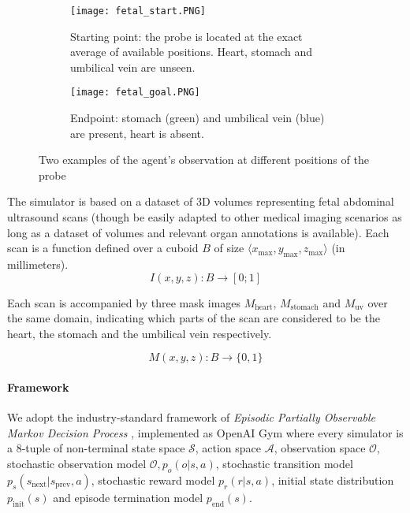 \begin{figure*}
    \centering
    \begin{subfigure}{.45\linewidth}
      \centering
      \texttt{[image: fetal\_start.PNG]}
      \caption{Starting point: the probe is located at the exact average of available positions. Heart, stomach and umbilical vein are unseen.}
      \label{fig:img-before}
    \end{subfigure}%
    \begin{subfigure}{.45\linewidth}
      \centering
      \texttt{[image: fetal\_goal.PNG]}
      \caption{Endpoint: stomach (green) and umbilical vein (blue) are present, heart is absent.}
      \label{fig:img-after}
    \end{subfigure}
    \caption{Two examples of the agent's observation at different positions of the probe}
    \label{fig:imgs}
\end{figure*}

The simulator is based on a dataset of 3D volumes representing fetal abdominal ultrasound scans (though be easily adapted to other medical imaging scenarios as long as a dataset of volumes and relevant organ annotations is available).
Each scan is a function defined over a cuboid $B$ of size $\langle x_\text{max},y_\text{max},z_\text{max} \rangle$ (in millimeters).
\begin{equation}
    I(x,y,z): B \rightarrow [0;1]
\end{equation}

Each scan is accompanied by three mask images $M_\text{heart}$, $M_\text{stomach}$ and $M_\text{uv}$ over the same domain, indicating which parts of the scan are considered to be the heart, the stomach and the umbilical vein respectively.

\begin{equation}
    M(x,y,z): B \rightarrow \{0,1\}
\end{equation}

\paragraph{Framework}

We adopt the industry-standard framework of {\em Episodic Partially Observable Markov Decision Process} \cite{kramerjdavidrPartiallyObservableMarkov1964, spaanPartiallyObservableMarkov2012}, implemented as OpenAI Gym \cite{gym} where every simulator is a 8-tuple of non-terminal state space $\mathcal{S}$, action space $\mathcal{A}$, observation space $\mathcal{O}$, stochastic observation model $\mathcal{O}, p_o(o | s, a)$, stochastic transition model $p_s(s_\text{next} | s_\text{prev}, a)$, stochastic reward model $p_r(r | s, a)$, initial state distribution $p_\text{init}(s)$ and episode termination model $p_\text{end}(s)$.

